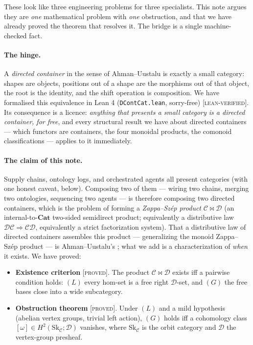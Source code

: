 \documentclass[11pt]{article}
\theoremstyle{definition}
\newcommand{\C}{\mathcal{C}}
\newcommand{\D}{\mathcal{D}}
\newcommand{\Sk}{\mathrm{Sk}}
\newcommand{\Cat}{\mathbf{Cat}}
\newcommand{\gLean}{\textsc{[lean-verified]}}
\newcommand{\gProved}{\textsc{[proved]}}
\begin{document}
These look like three engineering problems for three specialists. This note argues they
are \emph{one} mathematical problem with \emph{one} obstruction, and that we have already
proved the theorem that resolves it. The bridge is a single machine-checked fact.

\paragraph{The hinge.} A \emph{directed container} in the sense of Ahman--Uustalu
\cite{au-dccat} is exactly a small category: shapes are objects, positions out of a shape
are the morphisms out of that object, the root is the identity, and the shift operation is
composition. We have formalised this equivalence in Lean 4 (\texttt{DContCat.lean},
sorry-free) \gLean. Its consequence is a licence: \emph{anything that presents a small
category is a directed container, for free}, and every structural result we have about
directed containers --- which functors are containers, the four monoidal products, the
comonoid classifications --- applies to it immediately.

\paragraph{The claim of this note.} Supply chains, ontology logs, and orchestrated agents
all present categories (with one honest caveat, below). Composing two of them --- wiring
two chains, merging two ontologies, sequencing two agents --- is therefore composing two
directed containers, which is the problem of forming a \emph{Zappa--Sz\'ep
product} $\C\bowtie\D$ (an internal-to-$\Cat$ two-sided semidirect product; equivalently a
distributive law $\D\C\Rightarrow\C\D$, equivalently a strict factorization system). That a
distributive law of directed containers assembles this product --- generalizing the monoid
Zappa--Sz\'ep product --- is Ahman--Uustalu's \cite{au-distlaw}; what we add is a
characterization of \emph{when} it exists. We have proved:

\begin{itemize}
\item[(P1)] \textbf{Existence criterion} \cite{pairwise} \gProved. The product $\C\bowtie\D$
exists iff a pairwise condition holds: $(L)$ every hom-set is a free right $\D$-set, and
$(G)$ the free bases close into a wide subcategory.
\item[(P2)] \textbf{Obstruction theorem} \cite{gobstr} \gProved. Under $(L)$ and a mild
hypothesis (abelian vertex groups, trivial left action), $(G)$ holds iff a cohomology class
$[\omega]\in H^2(\Sk_\C;\D)$ vanishes, where $\Sk_\C$ is the orbit category and $\D$ the
vertex-group presheaf.
\end{itemize}
\end{document}
